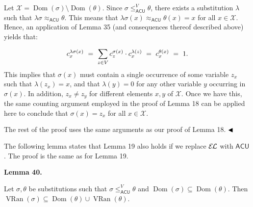 Let $\mathcal{X}=\operatorname{Dom}(\sigma)\setminus\operatorname{Dom}(\theta)$. Since $\sigma\leq_{\mathsf{ACU}}^{V}\theta$, there exists a substitution $\lambda$ such that $\lambda\sigma\approx_{\mathsf{ACU}}\theta$. This means that $\lambda\sigma(x)\approx_{\mathsf{ACU}}\theta(x)=x$ for all $x\in\mathcal{X}$. Hence, an application of Lemma 35 (and consequences thereof described above) yields that:\par
    \[c^{\lambda\sigma(x)}_{x}\ =\ \sum\limits_{z\in V}c^{\sigma(x)}_{z}\cdot c^{%
\lambda(z)}_{x}\ =\ c^{\theta(x)}_{x}\ =\ 1.\]    
This implies that $\sigma(x)$ must contain a single occurrence of some variable $z_{x}$ such that $\lambda(z_{x})=x$, and that $\lambda(y)=0$ for any other variable $y$ occurring in $\sigma(x)$. In addition, $z_{x}\neq z_{y}$ for different elements $x,y$ of $\mathcal{X}$. Once we have this, the same counting argument employed in the proof of Lemma 18 can be applied here to conclude that $\sigma(x)=z_{x}$ for all $x\in\mathcal{X}$.\par
 
 
 
The rest of the proof uses the same arguments as our proof of Lemma 18. $\hfill\blacktriangleleft$\par
 
 
 
The following lemma states that Lemma 19 also holds if we replace $\mathcal{E\mkern-1.618muL}$ with $\mathsf{ACU}$. The proof is the same as for Lemma 19.\par
 
 
 
\par\medskip\noindent\textbf{Lemma 40.}\par
 
 
Let $\sigma,\theta$ be substitutions such that $\sigma\leq_{\mathsf{ACU}}^{V}\theta$ and $\operatorname{Dom}(\sigma)\subseteq\operatorname{Dom}(\theta)$. Then $\operatorname{VRan}(\sigma)\subseteq\operatorname{Dom}(\theta)\cup%
\operatorname{VRan}(\theta)$.\par
 
 
 
